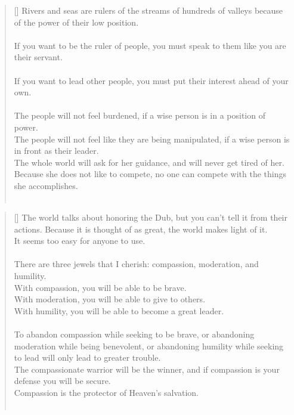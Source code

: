 \documentclass{article}
\begin{document}
\settowidth{\versewidth}{The Wizard leads byemptying people’s minds, filling their bellies, weakening their am- bitions, and making them become strong}
\begin{verse}[\versewidth]
Rivers and seas are rulers of the streams of hundreds of valleys because of the power of their low position.\\
\hfill\\
If you want to be the ruler of people, you must speak to them like you are their servant.\\
\hfill\\
If you want to lead other people, you must put their interest ahead of your own.\\
\hfill\\
The people will not feel burdened, if a wise person is in a position of power.\\
The people will not feel like they are being manipulated, if a wise person is in front as their leader.\\
The whole world will ask for her guidance, and will never get tired of her.\\
Because she does not like to compete, no one can compete with the things she accomplishes.\\
\hfill\\
\end{verse}

\settowidth{\versewidth}{The Wizard leads byemptying people’s minds, filling their bellies, weakening their am- bitions, and making them become strong}
\begin{verse}[\versewidth]
The world talks about honoring the Dub, but you can't tell it from their actions. 
Because it is thought of as great, the world makes light of it.\\
It seems too easy for anyone to use.\\
\hfill\\
There are three jewels that I cherish: compassion, moderation, and humility.\\
With compassion, you will be able to be brave.\\
With moderation, you will be able to give to others.\\
With humility, you will be able to become a great leader.\\
\hfill\\
To abandon compassion while seeking to be brave, or abandoning moderation while being benevolent, or abandoning humility while seeking to lead will only lead to greater trouble.\\
The compassionate warrior will be the winner, and if compassion is your defense you will be secure.\\
Compassion is the protector of Heaven's salvation.\\
\hfill\\
\end{verse}
\end{document}
